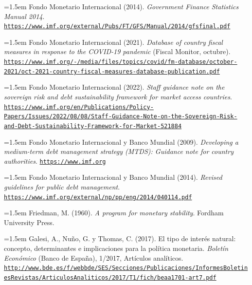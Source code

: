 \documentclass[10pt,a4paper]{article}
\begin{document}
\noindent\hangindent=1.5em Fondo Monetario Internacional (2014). \textit{Government Finance Statistics Manual 2014}. \href{https://www.imf.org/external/Pubs/FT/GFS/Manual/2014/gfsfinal.pdf}{\nolinkurl{https://www.imf.org/external/Pubs/FT/GFS/Manual/2014/gfsfinal.pdf}}

\noindent\hangindent=1.5em Fondo Monetario Internacional (2021). \textit{Database of country fiscal measures in response to the COVID-19 pandemic} (Fiscal Monitor, octubre). \href{https://www.imf.org/-/media/files/topics/covid/fm-database/october-2021/oct-2021-country-fiscal-measures-database-publication.pdf}{\nolinkurl{https://www.imf.org/-/media/files/topics/covid/fm-database/october-2021/oct-2021-country-fiscal-measures-database-publication.pdf}}

\noindent\hangindent=1.5em Fondo Monetario Internacional (2022). \textit{Staff guidance note on the sovereign risk and debt sustainability framework for market access countries}. \href{https://www.imf.org/en/Publications/Policy-Papers/Issues/2022/08/08/Staff-Guidance-Note-on-the-Sovereign-Risk-and-Debt-Sustainability-Framework-for-Market-521884}{\nolinkurl{https://www.imf.org/en/Publications/Policy-Papers/Issues/2022/08/08/Staff-Guidance-Note-on-the-Sovereign-Risk-and-Debt-Sustainability-Framework-for-Market-521884}}

\noindent\hangindent=1.5em Fondo Monetario Internacional y Banco Mundial (2009). \textit{Developing a medium-term debt management strategy (MTDS): Guidance note for country authorities}. \href{https://www.imf.org}{\nolinkurl{https://www.imf.org}}

\noindent\hangindent=1.5em Fondo Monetario Internacional y Banco Mundial (2014). \textit{Revised guidelines for public debt management}. \href{https://www.imf.org/external/np/pp/eng/2014/040114.pdf}{\nolinkurl{https://www.imf.org/external/np/pp/eng/2014/040114.pdf}}

\noindent\hangindent=1.5em Friedman, M. (1960). \textit{A program for monetary stability}. Fordham University Press.

\noindent\hangindent=1.5em Galesi, A., Nuño, G. y Thomas, C. (2017). El tipo de interés natural: concepto, determinantes e implicaciones para la política monetaria. \textit{Boletín Económico} (Banco de España), 1/2017, Artículos analíticos. \href{http://www.bde.es/f/webbde/SES/Secciones/Publicaciones/InformesBoletinesRevistas/ArticulosAnaliticos/2017/T1/fich/beaa1701-art7.pdf}{\nolinkurl{http://www.bde.es/f/webbde/SES/Secciones/Publicaciones/InformesBoletinesRevistas/ArticulosAnaliticos/2017/T1/fich/beaa1701-art7.pdf}}
\end{document}

